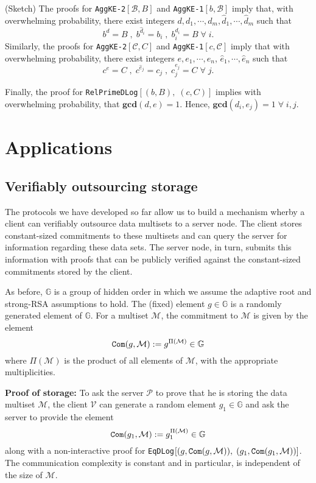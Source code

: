 \documentclass[11pt, lettersize, notitlepage, leqno, footskip=0.6cm]{article}
\newcommand{\mc}{\mathcal}
\newcommand{\mb}{\mathbb}
\newcommand{\mbf}{\mathbf}
\newcommand{\what}{\widehat}
\newcommand{\mP}{\mc{P}}
\newcommand{\V}{\mc{V}}
\newcommand{\vs}{\vspace{-0.15cm}}
\newcommand{\noin}{\noindent}
\newcommand{\op}{overwhelming probability}
\newcommand{\GCD}{\mbf{gcd}}
\numberwithin{equation}{section}
\begin{document}
\begin{prf} (Sketch) The proofs for \verb|AggKE-2|$[\mc{B}, B]$ and \verb|AggKE-1|$[b,\mc{B}]$ imply that, with overwhelming probability, there exist integers $d,d_1,\cdots,d_m,\what{d}_1,\cdots,\what{d}_m$ such that \vs $$b^d = B\;,\; b^{\what{d}_i}= b_i\;,\; b_i^{d_i}= B\;\forall\; i.$$ Similarly, the proofs for \verb|AggKE-2|$[\mc{C}, C]$ and \verb|AggKE-1|$[c,\mc{C}]$ imply that with overwhelming probability, there exist integers $e,e_1,\cdots,e_n$, $\what{e}_1,\cdots,\what{e}_n$ such that \vs $$c^e = C\;,\; c^{\what{e}_j}= c_j\;,\;c_j^{e_j}= C\;\forall\; j.$$ 

Finally, the proof for \verb|RelPrimeDLog|$[(b,B),\;(c,C)]$ implies with \op, that $\GCD(d,e) = 1$. Hence, $\GCD(d_i,e_j) = 1\;\forall\;i,j$.

\end{prf}

\bigskip

\section{\fontsize{12}{12} Applications}

\subsection{\fontsize{11}{11} Verifiably outsourcing storage}

The protocols we have developed so far allow us to build a mechanism wherby a client can verifiably outsource data multisets to a server node. The client stores constant-sized commitments to these multisets and can query the server for information regarding these data sets. The server node, in turn, submits this information with proofs that can  be publicly verified against the constant-sized commitments stored by the client.

As before, $\mb{G}$ is a group of hidden order in which we assume the adaptive root and strong-RSA assumptions to hold. The (fixed) element $g\in\mb{G}$ is a randomly generated element of $\mb{G}$. For a multiset $\mc{M}$, the commitment to $\mc{M}$ is given by the element \vs $$\protect{\verb|Com|}(g, \mc{M}):= g^{\Pi(\mc{M})}\in\mb{G}$$ where $\Pi(\mc{M})$ is the product of all elements of $\mc{M}$, with the appropriate multiplicities. \vspace{0.1cm}

\noin \textbf{Proof of storage:} To ask the server $\mP$ to prove that he is storing the data multiset $\mc{M}$, the client $\V$ can generate a random element $g_1\in\mb{G}$ and ask the server to provide the element \vs $$\protect{\verb|Com|}(g_1, \mc{M}):= g_1^{\Pi(\mc{M})}\in\mb{G}$$ along with a non-interactive proof for \verb|EqDLog|$[(g, \protect{\verb|Com|}(g, \mc{M})),\;(g_1, \protect{\verb|Com|}(g_1, \mc{M}))]$. The communication complexity is constant and in particular, is independent of the size of $\mc{M}$.\vspace{0.1cm}
\end{document}
